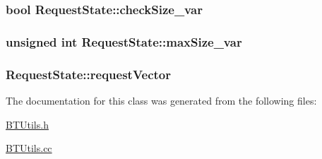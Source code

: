 \subsubsection[{check\+Size\+\_\+var}]{\setlength{\rightskip}{0pt plus 5cm}bool Request\+State\+::check\+Size\+\_\+var\hspace{0.3cm}{\ttfamily [protected]}}\label{classRequestState_ab245f922913e545c7509a9955a4e2575}
\hypertarget{classRequestState_a522c2201650b04cf0c6db6851bb5920b}{}
\subsubsection[{max\+Size\+\_\+var}]{\setlength{\rightskip}{0pt plus 5cm}unsigned int Request\+State\+::max\+Size\+\_\+var\hspace{0.3cm}{\ttfamily [protected]}}\label{classRequestState_a522c2201650b04cf0c6db6851bb5920b}
\hypertarget{classRequestState_ac61708dc216522bb0cac60a9d6742569}{}
\subsubsection[{request\+Vector}]{ Request\+State\+::request\+Vector\hspace{0.3cm}{\ttfamily [protected]}}\label{classRequestState_ac61708dc216522bb0cac60a9d6742569}


The documentation for this class was generated from the following files\+:\begin{DoxyCompactItemize}
\item 
\hyperlink{BTUtils_8h}{B\+T\+Utils.\+h}\item 
\hyperlink{BTUtils_8cc}{B\+T\+Utils.\+cc}\end{DoxyCompactItemize}
